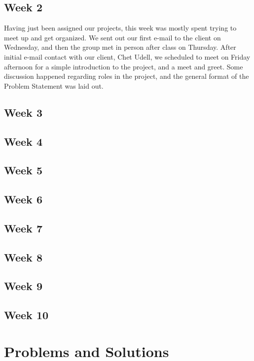 \documentclass[onecolumn, draftclsnofoot,10pt, compsoc]{IEEEtran}
\begin{document}
    \subsection{Week 2}
    Having just been assigned our projects, this week was mostly spent trying to meet up and get organized.
    We sent out our first e-mail to the client on Wednesday, and then the group met in person after class on Thursday.
    After initial e-mail contact with our client, Chet Udell, we scheduled to meet on Friday afternoon for a simple introduction to the project, and a meet and greet.
    Some discussion happened regarding roles in the project, and the general format of the Problem Statement was laid out.
    \subsection{Week 3}
    
    
    \subsection{Week 4}
    
    \subsection{Week 5}
    
    \subsection{Week 6}
    
    \subsection{Week 7}
    
    \subsection{Week 8}
    
    \subsection{Week 9}
    
    \subsection{Week 10}
    
    \section{Problems and Solutions}
    
\end{document}
